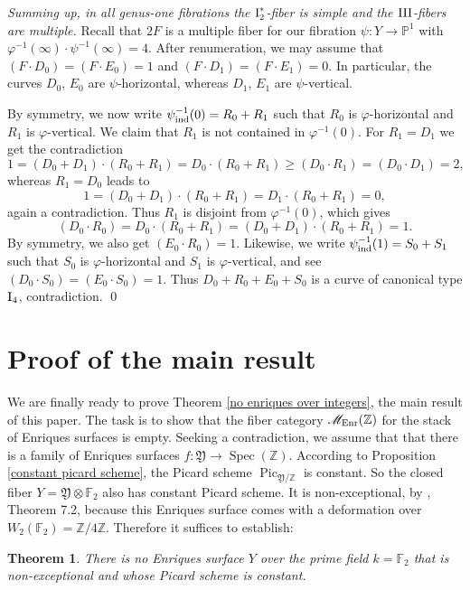\documentclass[oneside, 12pt]{amsart}
\newcommand\mylabel[1]{\label{#1}\marginpar{\vspace{-1ex}\medskip\medskip\footnotesize \tt #1}}
\renewcommand\mylabel[1]{\label{#1}}
\newtheorem{theorem}{Theorem}[section]
\theoremstyle{definition}
\theoremstyle{remark}
\newcommand{\ZZ}{\mathbb{Z}}
\newcommand{\FF}{\mathbb{F}}
\newcommand{\PP}{\mathbb{P}}
\newcommand{\shM}{\mathscr{M}}
\newcommand{\foY}{\mathfrak{Y}}
\newcommand{\I}{\text{\rm I}}
\newcommand{\III}{\text{\rm III}}
\newcommand{\Pic}{\operatorname{Pic}}
\newcommand{\ra}{\rightarrow}
\newcommand{\Spec}{\operatorname{Spec}}
\newcommand{\ind}{\text{\rm ind}}
\newcommand{\Enr}{{\text{\rm Enr}}}
\newcommand{\inv}{{-1}}
\begin{document}
\emph{Summing up, in  all genus-one fibrations the $\I_2^*$-fiber   is simple and the $\III$-fibers  
are multiple.} Recall that $2F$ is a multiple fiber for our fibration $\psi:Y\ra\PP^1$ with $\varphi^\inv(\infty)\cdot\psi^\inv(\infty)=4$.
After renumeration, we may assume that $(F\cdot D_0)=(F\cdot E_0)=1$ and $(F\cdot D_1)=(F\cdot E_1)=0$.
In particular, the curves $D_0$, $E_0$ are $\psi$-horizontal, whereas $D_1$, $E_1$ are $\psi$-vertical.

By symmetry, we now write  $\psi^{-1}_\ind(0)=R_0+R_1$ such that $R_0$ is $\varphi$-horizontal and  $R_1$ is $\varphi$-vertical.
We claim that $R_1$ is not contained in $\varphi^{-1}(0)$. 
For $R_1=D_1$ we get the contradiction
$$
1=(D_0+D_1)\cdot (R_0+R_1) = D_0\cdot (R_0+R_1)\geq (D_0\cdot R_1)=(D_0\cdot D_1)=2,
$$
whereas $R_1=D_0$ leads to  
$$
1=(D_0+D_1)\cdot (R_0+R_1) = D_1\cdot(R_0+R_1)    = 0,
$$
again a contradiction. Thus $R_1$ is disjoint from $\varphi^{-1}(0)$, which gives 
$$
(D_0\cdot R_0) = D_0\cdot (R_0+R_1) = (D_0+D_1)\cdot (R_0+R_1) = 1.
$$
By symmetry, we also get $(E_0\cdot R_0)=1$.
Likewise, we write $\psi^\inv_\ind(1)=S_0+S_1$ such that $S_0$ is $\varphi$-horizontal and  $S_1$ is $\varphi$-vertical,
and see $(D_0\cdot S_0)=(E_0\cdot S_0)=1$.
Thus   $D_0+ R_0+E_0+S_0$ is a curve of canonical type $\I_4$, contradiction.
\qed


\section{Proof of the main result}
\mylabel{Proof}

We are finally ready to prove Theorem \ref{no enriques over integers},  the main result of this paper.
The task is to show that the fiber category $\shM_\Enr(\ZZ)$ for the stack of Enriques surfaces is empty.
Seeking a contradiction, we assume that that there is a family of Enriques surfaces
$f:\foY\ra \Spec(\ZZ)$. According to Proposition \ref{constant picard scheme}, the Picard scheme $\Pic_{\foY/\ZZ}$ is constant.
So the closed fiber $Y=\foY\otimes\FF_2$ also has constant Picard scheme. 
It is  non-exceptional, by  \cite{Schroeer 2021b}, Theorem 7.2, because this Enriques surface
 comes with a deformation over $W_2(\FF_2)=\ZZ/4\ZZ$.
Therefore it suffices to establish:

\begin{theorem}
\mylabel{no non-exceptional}
There is no  Enriques surface $Y$ over the prime field $k=\FF_2$  that is  non-exceptional and  whose   Picard scheme
is constant.
\end{theorem}
\end{document}
